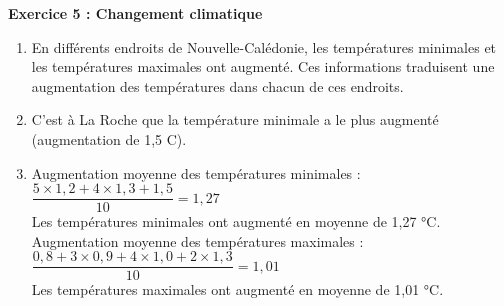 \textbf{Exercice 5 : Changement climatique}

\begin{enumerate}
\item En différents endroits de Nouvelle-Calédonie, les températures minimales et les températures maximales ont augmenté. Ces informations traduisent une augmentation des températures dans chacun de ces endroits. 
\item C'est à La Roche que la température minimale a le plus augmenté \linebreak (augmentation de 1,5 \degres C). 
\item Augmentation moyenne des températures minimales : \\[2mm]
$\dfrac{5\times1,2+4\times1,3+1,5}{10}=1,27$ \\[2mm]
Les températures minimales ont augmenté en moyenne de 1,27 °C. \\
Augmentation moyenne des températures maximales : \\[2mm]
$\dfrac{0,8+3\times0,9+4\times1,0+2\times1,3}{10}=1,01$ \\[2mm]
Les températures maximales ont augmenté en moyenne de 1,01 °C.
\end{enumerate}

\newpage

